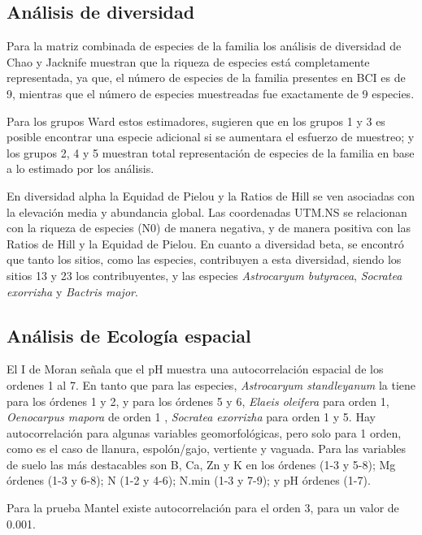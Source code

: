 \documentclass[11pt,]{article}
\begin{document}
\subsection{Análisis de diversidad}\label{anuxe1lisis-de-diversidad}

Para la matriz combinada de especies de la familia los análisis de
diversidad de Chao y Jacknife muestran que la riqueza de especies está
completamente representada, ya que, el número de especies de la familia
presentes en BCI es de 9, mientras que el número de especies muestreadas
fue exactamente de 9 especies.

Para los grupos Ward estos estimadores, sugieren que en los grupos 1 y 3
es posible encontrar una especie adicional si se aumentara el esfuerzo
de muestreo; y los grupos 2, 4 y 5 muestran total representación de
especies de la familia en base a lo estimado por los análisis.

En diversidad alpha la Equidad de Pielou y la Ratios de Hill se ven
asociadas con la elevación media y abundancia global. Las coordenadas
UTM.NS se relacionan con la riqueza de especies (N0) de manera negativa,
y de manera positiva con las Ratios de Hill y la Equidad de Pielou. En
cuanto a diversidad beta, se encontró que tanto los sitios, como las
especies, contribuyen a esta diversidad, siendo los sitios 13 y 23 los
contribuyentes, y las especies \emph{Astrocaryum butyracea},
\emph{Socratea exorrizha} y \emph{Bactris major}.

\subsection{Análisis de Ecología
espacial}\label{anuxe1lisis-de-ecologuxeda-espacial}

El I de Moran señala que el pH muestra una autocorrelación espacial de
los ordenes 1 al 7. En tanto que para las especies, \emph{Astrocaryum
standleyanum} la tiene para los órdenes 1 y 2, y para los órdenes 5 y 6,
\emph{Elaeis oleifera} para orden 1, \emph{Oenocarpus mapora} de orden 1
, \emph{Socratea exorrizha} para orden 1 y 5. Hay autocorrelación para
algunas variables geomorfológicas, pero solo para 1 orden, como es el
caso de llanura, espolón/gajo, vertiente y vaguada. Para las variables
de suelo las más destacables son B, Ca, Zn y K en los órdenes (1-3 y
5-8); Mg órdenes (1-3 y 6-8); N (1-2 y 4-6); N.min (1-3 y 7-9); y pH
órdenes (1-7).

Para la prueba Mantel existe autocorrelación para el orden 3, para un
valor de 0.001.
\end{document}
